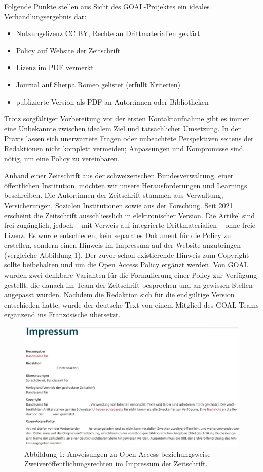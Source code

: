 \documentclass[a4paper,
fontsize=11pt,
oneside,
numbers=noperiodatend,
parskip=half-,
bibliography=totoc,
final
]{scrartcl}
\begin{document}
Folgende Punkte stellen aus Sicht des GOAL-Projektes ein ideales
Verhandlungsergebnis dar:

\begin{itemize}
\item
  Nutzungslizenz CC BY, Rechte an Drittmaterialien geklärt
\item
  Policy auf Website der Zeitschrift
\item
  Lizenz im PDF vermerkt
\item
  Journal auf Sherpa Romeo gelistet (erfüllt Kriterien)
\item
  publizierte Version als PDF an Autor:innen oder Bibliotheken
\end{itemize}

Trotz sorgfältiger Vorbereitung vor der ersten Kontaktaufnahme gibt es
immer eine Unbekannte zwischen idealem Ziel und tatsächlicher Umsetzung.
In der Praxis lassen sich unerwartete Fragen oder unbeachtete
Perspektiven seitens der Redaktionen nicht komplett vermeiden;
Anpassungen und Kompromisse sind nötig, um eine Policy zu vereinbaren.

Anhand einer Zeitschrift aus der schweizerischen Bundesverwaltung, einer
öffentlichen Institution, möchten wir unsere Herausforderungen und
Learnings beschreiben. Die Autor:innen der Zeitschrift stammen aus
Verwaltung, Versicherungen, Sozialen Institutionen sowie aus der
Forschung. Seit 2021 erscheint die Zeitschrift ausschliesslich in
elektronischer Version. Die Artikel sind frei zugänglich, jedoch -- mit
Verweis auf integrierte Drittmaterialien -- ohne freie Lizenz. Es wurde
entschieden, kein separates Dokument für die Policy zu erstellen,
sondern einen Hinweis im Impressum auf der Website anzubringen
(vergleiche Abbildung 1). Der zuvor schon existierende Hinweis zum
Copyright sollte beibehalten und um die Open Access Policy ergänzt
werden. Von GOAL wurden zwei denkbare Varianten für die Formulierung
einer Policy zur Verfügung gestellt, die danach im Team der Zeitschrift
besprochen und an gewissen Stellen angepasst wurden. Nachdem die
Redaktion sich für die endgültige Version entschieden hatte, wurde der
deutsche Text von einem Mitglied des GOAL-Teams ergänzend ins
Französische übersetzt.

\begin{figure}[h!]
\centering
\includegraphics{img/andres_corredera_abb1.jpg}
\caption{Abbildung 1: Anweisungen zu Open Access beziehungsweise
Zweiveröffentlichungsrechten im Impressum der Zeitschrift.}
\end{figure}
\end{document}
